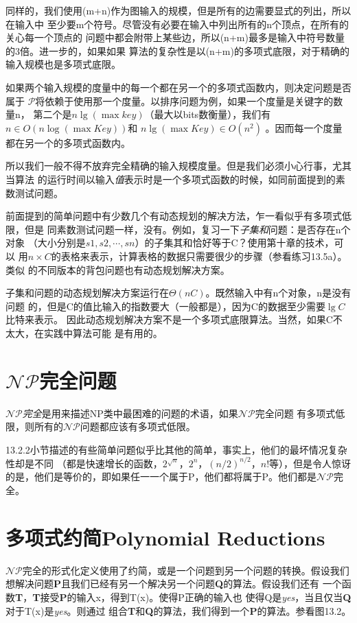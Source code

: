 同样的，我们使用(m+n)作为图输入的规模，但是所有的边需要显式的列出，所以在输入中
至少要m个符号。尽管没有必要在输入中列出所有的n个顶点，在所有的关心每一个顶点的
问题中都会附带上某些边，所以(n+m)最多是输入中符号数量的3倍。进一步的，如果如果
算法的复杂性是以(n+m)的多项式底限，对于精确的输入规模也是多项式底限。

如果两个输入规模的度量中的每一个都在另一个的多项式函数内，则决定问题是否属于
$\mathcal{P}$将依赖于使用那一个度量。以排序问题为例，如果一个度量是关键字的数量n，
第二个是$n\lg(\max key)$（最大以bits数衡量），我们有$n\in O(n\log(\max Key))$和
$n\lg(\max Key)\in O(n^2)$ 。因而每一个度量都在另一个的多项式函数内。

所以我们一般不得不放弃完全精确的输入规模度量。但是我们必须小心行事，尤其当算法
的运行时间以输入\emph{值}表示时是一个多项式函数的时候，如同前面提到的素数测试问题。

前面提到的简单问题中有少数几个有动态规划的解决方法，乍一看似乎有多项式低限，但是
同素数测试问题一样，没有。例如，复习一下\emph{子集和}问题：是否存在n个对象
（大小分别是$s1, s2, \cdots, sn$）的子集其和恰好等于C？使用第十章的技术，可以
用$n\times C$的表格来表示，计算表格的数据只需要很少的步骤（参看练习13.5a）。类似
的不同版本的背包问题也有动态规划解决方案。

子集和问题的动态规划解决方案运行在$\Theta(nC)$。既然输入中有n个对象，n是没有问题
的，但是C的值比输入的指数要大（一般都是），因为C的数据至少需要$\lg C$比特来表示。
因此动态规划解决方案不是一个多项式底限算法。当然，如果C不太大，在实践中算法可能
是有用的。

\section{$\mathcal {NP}$完全问题}
\emph{$\mathcal{NP}$完全}是用来描述NP类中最困难的问题的术语，如果$\mathcal{NP}$完全问题
有多项式低限，则所有的$\mathcal{NP}$问题都应该有多项式低限。

13.2.2小节描述的有些简单问题似乎比其他的简单，事实上，他们的最坏情况复杂性却是不同
（都是快速增长的函数，$2^{\sqrt{n}}$，$2^n$，$(n/2)^{n/2}$，$n!$等），但是令人惊讶
的是，他们是等价的，即如果任一一个属于P，他们都将属于P。他们都是$\mathcal{NP}$完全。

\section{多项式约简Polynomial Reductions}
$\mathcal{NP}$完全的形式化定义使用了约简，或是一个问题到另一个问题的转换。假设我们
想解决问题\textbf{P}且我们已经有另一个解决另一个问题\textbf{Q}的算法。假设我们还有
一个函数\textbf{T}，\textbf{T}接受\textbf{P}的输入x，得到T(x)。使得P正确的输入也
使得Q是\emph{yes}，当且仅当\textbf{Q}对于T(x)是\emph{yes}。则通过
组合\textbf{T}和\textbf{Q}的算法，我们得到一个\textbf{P}的算法。参看图13.2。

